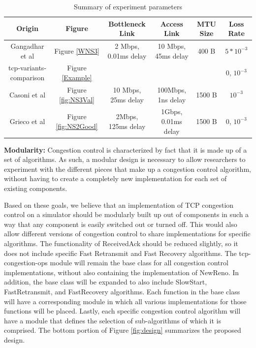 \documentclass[conference]{IEEEtran}
\begin{document}
\begin{table}[!t]
\renewcommand{\arraystretch}{1.3}
\caption{Summary of experiment parameters} 
\label{table:exps}
\centering
\begin{tabular}{|c||c||c||c||c||c|}
\hline
\textbf{Origin} & \textbf{Figure} & \textbf{Bottleneck Link} & \textbf{Access Link} & \textbf{MTU Size} & \textbf{Loss Rate} \\ 
\hline
Gangadhar et al\cite{NS3W} & Figure \ref{WNS3} & 2 Mbps, 0.01ms delay & 10 Mbps, 45ms delay & 400 B & $5*10^{-3}$ \\
tcp-variants-comparison & Figure \ref{Example} &  &  &  & 0, $10^{-3}$ \\
\hline
Casoni et al\cite{NS3Val} & Figure \ref{fig:NS3Val} & 10 Mbps, 25ms delay & 100Mbps, 1ns delay & 1500 B & $10^{-3}$ \\
\hline
Grieco et al\cite{NS2WP} & Figure \ref{fig:NS2Good} & 2Mbps, 125ms delay & 1Gbps, 0.01ms delay & 1500 B & 0, $10^{-3}$ \\
\hline
\end{tabular}
\end{table}

\textbf{Modularity:} Congestion control is characterized by fact that it is made up of a set of algorithms. As such, a modular design is necessary to allow researchers to experiment with the different pieces that make up a congestion control algorithm, without having to create a completely new implementation for each set of existing components. 

Based on these goals, we believe that an implementation of TCP congestion control on a simulator should be modularly built up out of components in such a way that any component is easily switched out or turned off. This would also allow different versions of congestion control to share implementations for specific algorithms. The functionality of ReceivedAck should be reduced slightly, so it does not include specific Fast Retransmit and Fast Recovery algorithms. The tcp-congestion-ops module will remain the base class for all congestion control implementations, without also containing the implementation of NewReno. In addition, the base class will be expanded to also include SlowStart, FastRetransmit, and FastRecovery algorithms. Each function in the base class will have a corresponding module in which all various implementations for those functions will be placed. Lastly, each specific congestion control algorithm will have a module that defines the selection of sub-algorithms of which it is comprised. The bottom portion of Figure \ref{fig:design} summarizes the proposed design. 
\end{document}
